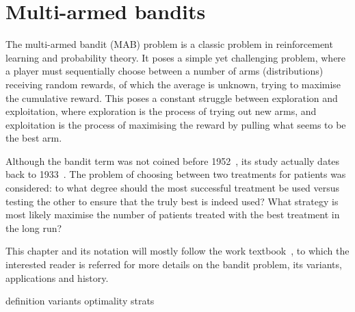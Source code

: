 \chapter{Multi-armed bandits}
\label{chap:bandits}

The multi-armed bandit (MAB) problem is a classic problem in reinforcement learning and probability theory.
It poses a simple yet challenging problem, where a player must sequentially choose between a number of arms (distributions) receiving random rewards, of which the average is unknown, trying to maximise the cumulative reward.
This poses a constant struggle between exploration and exploitation, where exploration is the process of trying out new arms, and exploitation is the process of maximising the reward by pulling what seems to be the best arm.

Although the bandit term was not coined before 1952~\autocite{robbins1952}, its study actually dates back to 1933~\autocite{thompson1933}.
The problem of choosing between two treatments for patients was considered: to what degree should the most successful treatment be used versus testing the other to ensure that the truly best is indeed used?
What strategy is most likely maximise the number of patients treated with the best treatment in the long run?

This chapter and its notation will mostly follow the work textbook~\autocite{lattimore2020}, to which the interested reader is referred for more details on the bandit problem, its variants, applications and history.



{definition}
{variants}
{optimality}
{strats}

